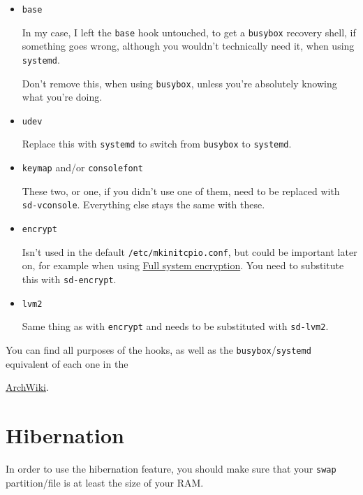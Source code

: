 \documentclass[9pt]{report}
\newenvironment{NOTE}
{\begin{tcolorbox}[colback=admonitionBG,coltitle=draculaFG,colframe=draculaBlue,colbacktitle=draculaBlue,title=NOTE]}
{\end{tcolorbox}}
\newenvironment{WARNING}
{\begin{tcolorbox}[colback=admonitionBG,coltitle=draculaBG,colframe=draculaOrange,colbacktitle=draculaOrange,title=WARNING]}
{\end{tcolorbox}}
\begin{document}
\begin{itemize}

    \item \texttt{base}

        In my case, I left the \texttt{base} hook untouched, to get a \texttt{busybox} recovery shell, if something goes wrong, although you wouldn’t technically need it, when using \texttt{systemd}.


        \begin{WARNING}
            Don’t remove this, when using \texttt{busybox}, unless you’re absolutely knowing what you’re doing.
        \end{WARNING}

    \item \texttt{udev}

        Replace this with \texttt{systemd} to switch from \texttt{busybox} to \texttt{systemd}.

    \item \texttt{keymap} and/or \texttt{consolefont}

        These two, or one, if you didn’t use one of them, need to be replaced with \texttt{sd-vconsole}.
        Everything else stays the same with these.

    \item \texttt{encrypt}

        Isn’t used in the default \texttt{/etc/mkinitcpio.conf}, but could be important later on, for example when using \hyperlink{full-system-encryption}{Full system encryption}.
        You need to substitute this with \texttt{sd-encrypt}.

    \item \texttt{lvm2}

        Same thing as with \texttt{encrypt} and needs to be substituted with \texttt{sd-lvm2}.

\end{itemize}


\begin{NOTE}
    You can find all purposes of the hooks, as well as the \texttt{busybox}/\texttt{systemd} equivalent of each one in the

    \href{https://wiki.archlinux.org/index.php/Mkinitcpio#Common_hooks}{ArchWiki}.

\end{NOTE}

\newpage

\hypertarget{x-hibernation}{\section{Hibernation}}
In order to use the hibernation feature, you should make sure that your \texttt{swap} partition/file is at least the size of your RAM.
\end{document}
